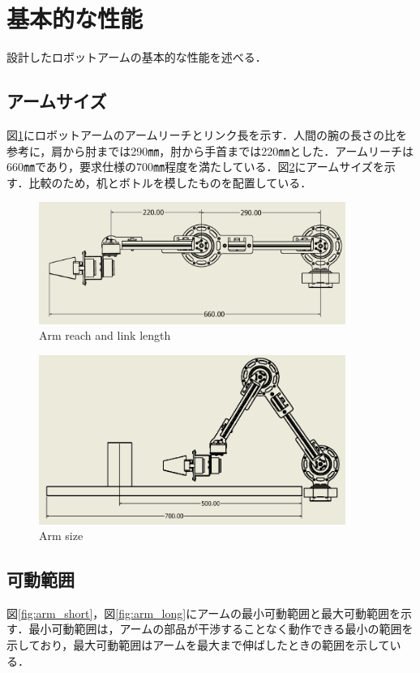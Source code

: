 \section{基本的な性能}
設計したロボットアームの基本的な性能を述べる．
\subsection{アームサイズ}
図\ref{fig:link_length}にロボットアームのアームリーチとリンク長を示す．人間の腕の長さの比\cite{humanarm:online}を参考に，肩から肘までは290㎜，肘から手首までは220㎜とした．アームリーチは660㎜であり，要求仕様の700㎜程度を満たしている．図\ref{fig:arm_size}にアームサイズを示す．比較のため，机とボトルを模したものを配置している．

\begin{figure}[htbp]
  \centering
  \includegraphics[width=10cm]{images/design/link_length.png}
  \caption{Arm reach and link length}
  \label{fig:link_length}
\end{figure}

\begin{figure}[htbp]
  \centering
  \includegraphics[width=10cm]{images/design/hikaku.png}
  \caption{Arm size}
  \label{fig:arm_size}
\end{figure}

\clearpage

\subsection{可動範囲}
図\ref{fig:arm_short}，図\ref{fig:arm_long}にアームの最小可動範囲と最大可動範囲を示す．最小可動範囲は，アームの部品が干渉することなく動作できる最小の範囲を示しており，最大可動範囲はアームを最大まで伸ばしたときの範囲を示している．

